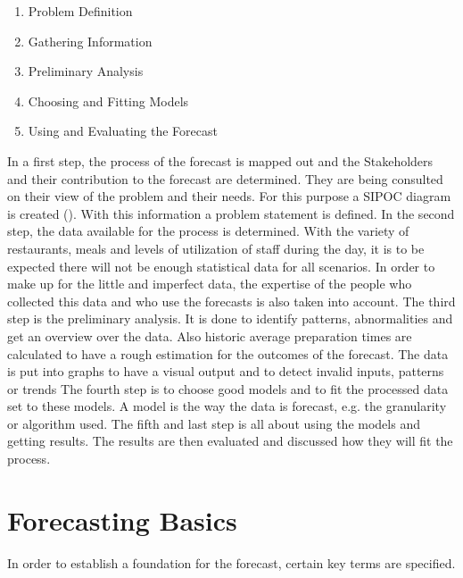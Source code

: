 \begin{enumerate}
\item Problem Definition
\item Gathering Information
\item Preliminary Analysis
\item Choosing and Fitting Models
\item Using and Evaluating the Forecast
\end{enumerate}

In a first step, the process of the forecast is mapped out and the Stakeholders and their contribution to the forecast are determined. They are being consulted on their view of the problem and their needs. For this purpose a SIPOC diagram is created (\cite{SIPOC}). With this information a problem statement is defined.\newline
In the second step, the data available for the process is determined. With the variety of restaurants, meals and levels of utilization of staff during the day, it is to be expected there will not be enough statistical data for all scenarios. In order to make up for the little and imperfect data, the expertise of the people who collected this data and who use the forecasts is also taken into account.\newline
The third step is the preliminary analysis. It is done to identify patterns, abnormalities and get an overview over the data. Also historic average preparation times are calculated to have a rough estimation for the outcomes of the forecast. The data is put into graphs to have a visual output and to detect invalid inputs, patterns or trends\newline
The fourth step is to choose good models and to fit the processed data set to these models. A model is the way the data is forecast, e.g. the granularity or algorithm used.\newline
The fifth and last step is all about using the models and getting results. The results are then evaluated and discussed how they will fit the process.
\section{Forecasting Basics}\label{section:Forecast Basics}
In order to establish a foundation for the forecast, certain key terms are specified.
